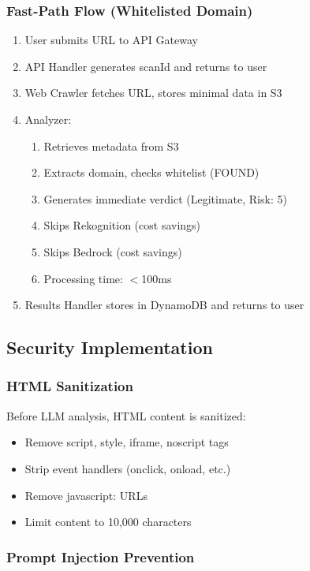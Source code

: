 \documentclass[conference]{IEEEtran}
\begin{document}
\subsubsection{Fast-Path Flow (Whitelisted Domain)}

\begin{enumerate}
\item User submits URL to API Gateway
\item API Handler generates scanId and returns to user
\item Web Crawler fetches URL, stores minimal data in S3
\item Analyzer:
  \begin{enumerate}
  \item Retrieves metadata from S3
  \item Extracts domain, checks whitelist (FOUND)
  \item Generates immediate verdict (Legitimate, Risk: 5)
  \item Skips Rekognition (cost savings)
  \item Skips Bedrock (cost savings)
  \item Processing time: $<$100ms
  \end{enumerate}
\item Results Handler stores in DynamoDB and returns to user
\end{enumerate}

\subsection{Security Implementation}

\subsubsection{HTML Sanitization}

Before LLM analysis, HTML content is sanitized:
\begin{itemize}
\item Remove script, style, iframe, noscript tags
\item Strip event handlers (onclick, onload, etc.)
\item Remove javascript: URLs
\item Limit content to 10,000 characters
\end{itemize}

\subsubsection{Prompt Injection Prevention}
\end{document}
